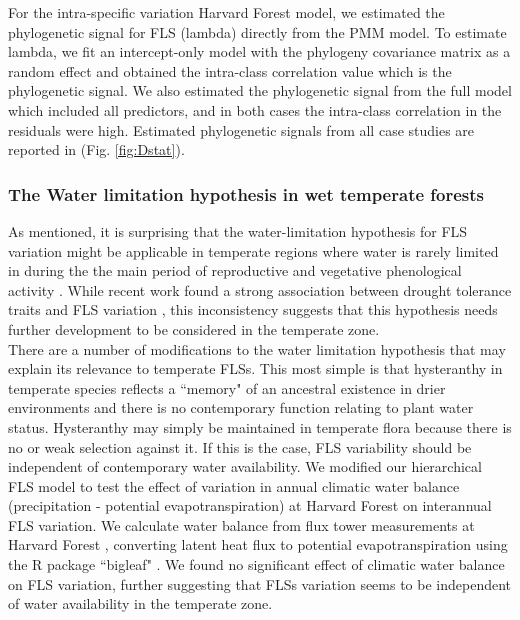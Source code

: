 \documentclass[11pt]{article}
\begin{document}
{\noindent For the intra-specific variation Harvard Forest model, we estimated the phylogenetic signal for FLS (lambda) directly from the PMM model. To estimate lambda, we fit an intercept-only model with the phylogeny covariance matrix as a random effect and obtained the intra-class correlation value which is the phylogenetic signal. We also estimated the phylogenetic signal from the full model which included all predictors, and in both cases the intra-class correlation in the residuals were high. Estimated phylogenetic signals from all case studies are reported in (Fig. \ref{fig:Dstat}).  
  
\subsubsection*{The Water limitation hypothesis in wet temperate forests}
\noindent As mentioned, it is surprising that the water-limitation hypothesis for FLS variation might be applicable in temperate regions where water is rarely limited in during the the main period of reproductive and vegetative phenological activity \citep{Polgar2011}. While recent work found a strong association between drought tolerance traits and FLS variation \citep{Gougherty2018}, this inconsistency suggests that this hypothesis needs further development to be considered in the temperate zone.\\

\noindent There are a number of modifications to the water limitation hypothesis that may explain its relevance to temperate FLSs. This most simple is that hysteranthy in temperate species reflects a ``memory" of an ancestral existence in drier environments and there is no contemporary function relating to plant water status. Hysteranthy may simply be maintained in temperate flora because there is no or weak selection against it. If this is the case, FLS variability should be independent of contemporary water availability. We modified our hierarchical FLS model to test the effect of variation in annual climatic water balance (precipitation - potential evapotranspiration) at Harvard Forest on interannual FLS variation. We calculate water balance from flux tower measurements at Harvard Forest \citep{Hadley2004}, converting latent heat flux to potential evapotranspiration using the R package ``bigleaf" \citep{Knauer2018}. We found no significant effect of climatic water balance on FLS variation, further suggesting that FLSs variation seems to be independent of water availability in the temperate zone.\\

}
\end{document}
